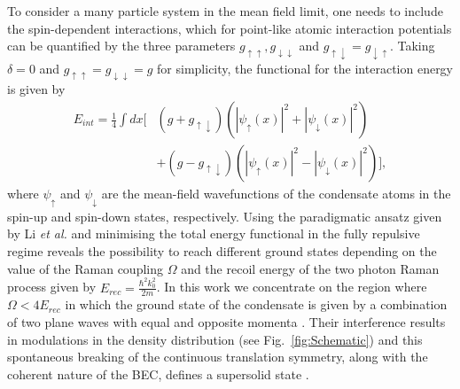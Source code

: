 \documentclass[12pt]{iopart}
\begin{document}
To consider a many particle system in the mean field limit, one needs to include the spin-dependent interactions, which for  point-like atomic interaction potentials can be quantified by the three parameters $g_{\uparrow\uparrow}, g_{\downarrow\downarrow}$ and $g_{\uparrow\downarrow}=g_{\downarrow\uparrow}$. Taking $\delta=0$ and $g_{\uparrow\uparrow}=g_{\downarrow\downarrow}=g$ for simplicity, the functional for the interaction energy is given by
\begin{eqnarray}
    E_{int}= \frac{1}{4}\int dx\Big[&(g+g_{\uparrow \downarrow})(|\psi_{\uparrow}(x)|^2+|\psi_{\downarrow}(x)|^2)
    \nonumber\\
    &+ (g-g_{\uparrow \downarrow})(|\psi_{\uparrow}(x)|^2-|\psi_{\downarrow}(x)|^2)\Big],
\end{eqnarray}
where $\psi_{\uparrow}$ and $\psi_{\downarrow}$ are the mean-field wavefunctions of the condensate atoms in the spin-up and spin-down states, respectively.
Using the paradigmatic ansatz given by Li \textit{et al.} \cite{li_2012} and minimising the total energy functional in the fully repulsive regime reveals the possibility to reach different ground states depending on the value of the Raman coupling $\Omega$ and the recoil energy of the two photon Raman process given by $E_{rec}=\frac{\hbar^2 k_0^2}{2m}$. In this work we concentrate on the region where $\Omega< 4E_{rec}$ in which the ground state of the condensate is given by a combination of two plane waves with equal and opposite momenta \cite{Pitaevskiistringari2016}. Their interference results in modulations in the density distribution (see Fig.~\ref{fig:Schematic}) and this spontaneous breaking of the continuous translation symmetry, along with the coherent nature of the BEC, defines a supersolid state \cite{li_2017}.
\end{document}

